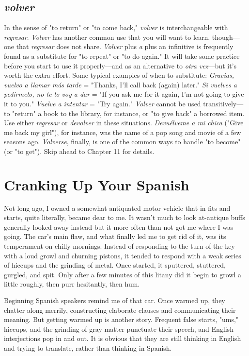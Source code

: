 \documentclass[14pt,a4paper,oneside]{memoir}
\begin{document}
\section{\emph{volver}}

In the sense of "to return" or "to come back," \emph{volver} is interchangeable with \emph{regresar}. \emph{Volver} has another common use that you
will want to learn, though---one that \emph{regresar} does not share. \emph{Volver}
plus \emph{a} plus an infinitive is frequently found as a substitute for "to repeat" or "to do again." It will take some practice before you start to
use it properly---and as an alternative to \emph{otra vez}---but it's worth the
extra effort. Some typical examples of when to substitute: \emph{Gracias,
vuelvo a llamar más tarde} = "Thanks, I'll call back (again) later." \emph{Si
vuelves a pedírmelo, no te lo voy a dar} = "If you ask me for it again,
I'm not going to give it to you." \emph{Vuelve a intentar} = "Try again."
\emph{Volver} cannot be used transitively---to "return" a book to the library, for
instance, or "to give back" a borrowed item. Use either \emph{regresar} or \emph{devolver} in these situations. \emph{Devuélveme a mi chica} ("Give me back my
girl"), for instance, was the name of a pop song and movie of a few seasons ago. \emph{Volverse}, finally, is one of the common ways to handle "to
become" (or "to get"). Skip ahead to Chapter 11 for details.

\chapter{Cranking Up Your Spanish}

Not long ago, I owned a somewhat antiquated motor vehicle
that in fits and starts, quite literally, became dear to me. It wasn't
much to look at-antique buffs generally looked away instead-but
it more often than not got me where I was going. The car's main flaw,
and what finally led me to get rid of it, was its temperament on chilly
mornings. Instead of responding to the turn of the key with a loud
growl and churning pistons, it tended to respond with a weak series of
hiccups and the grinding of metal. Once started, it sputtered, stuttered,
gurgled, and spit. Only after a few minutes of this litany did it begin to
growl a little roughly, then purr hesitantly, then hum.

Beginning Spanish speakers remind me of that car. Once
warmed up, they chatter along merrily, constructing elaborate clauses
and communicating their meaning. But getting warmed up is another
story. Frequent false starts, "ums," hiccups, and the grinding of gray
matter punctuate their speech, and English interjections pop in and
out. It is obvious that they are still thinking in English and trying to
translate, rather than thinking in Spanish.
\end{document}
